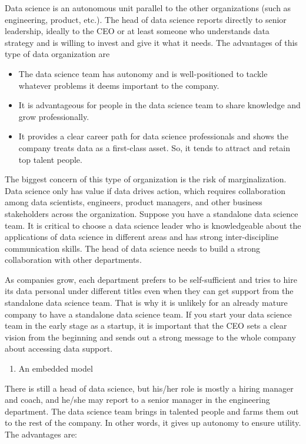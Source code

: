 \documentclass[
  12pt,
]{krantz}
\providecommand{\tightlist}{%
  \setlength{\itemsep}{0pt}\setlength{\parskip}{0pt}}
\begin{document}
Data science is an autonomous unit parallel to the other organizations (such as engineering, product, etc.). The head of data science reports directly to senior leadership, ideally to the CEO or at least someone who understands data strategy and is willing to invest and give it what it needs. The advantages of this type of data organization are

\begin{itemize}
\tightlist
\item
  The data science team has autonomy and is well-positioned to tackle whatever problems it deems important to the company.
\item
  It is advantageous for people in the data science team to share knowledge and grow professionally.
\item
  It provides a clear career path for data science professionals and shows the company treats data as a first-class asset. So, it tends to attract and retain top talent people.
\end{itemize}

The biggest concern of this type of organization is the risk of marginalization. Data science only has value if data drives action, which requires collaboration among data scientists, engineers, product managers, and other business stakeholders across the organization. Suppose you have a standalone data science team. It is critical to choose a data science leader who is knowledgeable about the applications of data science in different areas and has strong inter-discipline communication skills. The head of data science needs to build a strong collaboration with other departments.

As companies grow, each department prefers to be self-sufficient and tries to hire its data personal under different titles even when they can get support from the standalone data science team. That is why it is unlikely for an already mature company to have a standalone data science team. If you start your data science team in the early stage as a startup, it is important that the CEO sets a clear vision from the beginning and sends out a strong message to the whole company about accessing data support.

\begin{enumerate}
\def\labelenumi{(\arabic{enumi})}
\setcounter{enumi}{1}
\tightlist
\item
  An embedded model
\end{enumerate}

There is still a head of data science, but his/her role is mostly a hiring manager and coach, and he/she may report to a senior manager in the engineering department. The data science team brings in talented people and farms them out to the rest of the company. In other words, it gives up autonomy to ensure utility. The advantages are:
\end{document}
